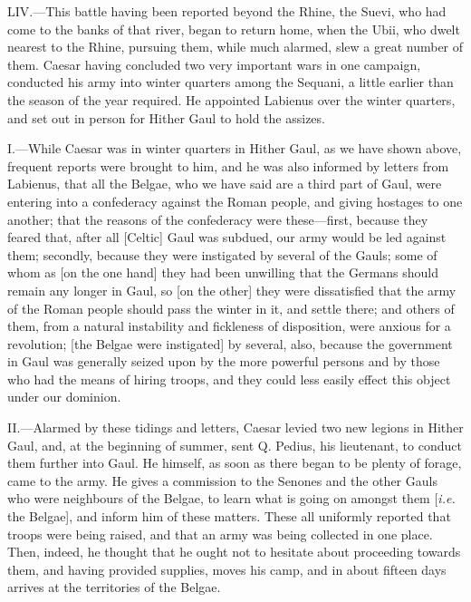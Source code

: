 LIV.—This battle having been reported beyond the Rhine, the Suevi, who
had come to the banks of that river, began to return home, when the
Ubii, who dwelt nearest to the Rhine, pursuing them, while much alarmed,
slew a great number of them. Caesar having concluded two very important
wars in one campaign, conducted his army into winter quarters among the
Sequani, a little earlier than the season of the year required. He
appointed Labienus over the winter quarters, and set out in person for
Hither Gaul to hold the assizes.


I.—While Caesar was in winter quarters in Hither Gaul, as we have shown
above, frequent reports were brought to him, and he was also informed by
letters from Labienus, that all the Belgae, who we have said are a third
part of Gaul, were entering into a confederacy against the Roman people,
and giving hostages to one another; that the reasons of the confederacy
were these—first, because they feared that, after all [Celtic] Gaul was
subdued, our army would be led against them; secondly, because they were
instigated by several of the Gauls; some of whom as [on the one hand]
they had been unwilling that the Germans should remain any longer in
Gaul, so [on the other] they were dissatisfied that the army of the
Roman people should pass the winter in it, and settle there; and others
of them, from a natural instability and fickleness of disposition, were
anxious for a revolution; [the Belgae were instigated] by several, also,
because the government in Gaul was generally seized upon by the more
powerful persons and by those who had the means of hiring troops, and
they could less easily effect this object under our dominion.

II.—Alarmed by these tidings and letters, Caesar levied two new legions
in Hither Gaul, and, at the beginning of summer, sent Q. Pedius, his
lieutenant, to conduct them further into Gaul. He himself, as soon as
there began to be plenty of forage, came to the army. He gives a
commission to the Senones and the other Gauls who were neighbours of the
Belgae, to learn what is going on amongst them [\emph{i.e.} the Belgae], and
inform him of these matters. These all uniformly reported that troops
were being raised, and that an army was being collected in one place.
Then, indeed, he thought that he ought not to hesitate about proceeding
towards them, and having provided supplies, moves his camp, and in about
fifteen days arrives at the territories of the Belgae.

